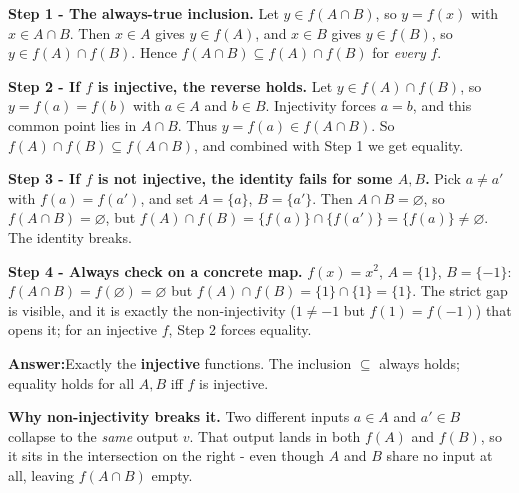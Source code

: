 \documentclass[11pt,a4paper]{article}
\newcommand{\answer}[1]{\begin{answerbox}\centering\textbf{Answer:}\quad #1\end{answerbox}}
\begin{document}
\textbf{Step 1 - The always-true inclusion.} Let $y\in f(A\cap B)$, so $y=f(x)$ with
$x\in A\cap B$. Then $x\in A$ gives $y\in f(A)$, and $x\in B$ gives $y\in f(B)$, so
$y\in f(A)\cap f(B)$. Hence $f(A\cap B)\subseteq f(A)\cap f(B)$ for \emph{every} $f$.

\textbf{Step 2 - If $f$ is injective, the reverse holds.} Let $y\in f(A)\cap f(B)$, so
$y=f(a)=f(b)$ with $a\in A$ and $b\in B$. Injectivity forces $a=b$, and this common point lies in
$A\cap B$. Thus $y=f(a)\in f(A\cap B)$. So $f(A)\cap f(B)\subseteq f(A\cap B)$, and combined with
Step 1 we get equality.

\textbf{Step 3 - If $f$ is not injective, the identity fails for some $A,B$.} Pick $a\ne a'$ with
$f(a)=f(a')$, and set $A=\{a\}$, $B=\{a'\}$. Then $A\cap B=\varnothing$, so $f(A\cap B)=\varnothing$,
but $f(A)\cap f(B)=\{f(a)\}\cap\{f(a')\}=\{f(a)\}\ne\varnothing$. The identity breaks.

\textbf{Step 4 - Always check on a concrete map.} $f(x)=x^2$, $A=\{1\}$, $B=\{-1\}$:
$f(A\cap B)=f(\varnothing)=\varnothing$ but $f(A)\cap f(B)=\{1\}\cap\{1\}=\{1\}$. The strict gap is
visible, and it is exactly the non-injectivity ($1\neq-1$ but $f(1)=f(-1)$) that opens it; for an
injective $f$, Step 2 forces equality.

\answer{Exactly the \textbf{injective} functions. The inclusion $\subseteq$ always holds; equality
holds for all $A,B$ iff $f$ is injective.}

\medskip
\textbf{Why non-injectivity breaks it.} Two different inputs $a\in A$ and $a'\in B$ collapse to the
\emph{same} output $v$. That output lands in both $f(A)$ and $f(B)$, so it sits in the intersection
on the right - even though $A$ and $B$ share no input at all, leaving $f(A\cap B)$ empty.

\begin{center}
\end{center}
\end{document}
